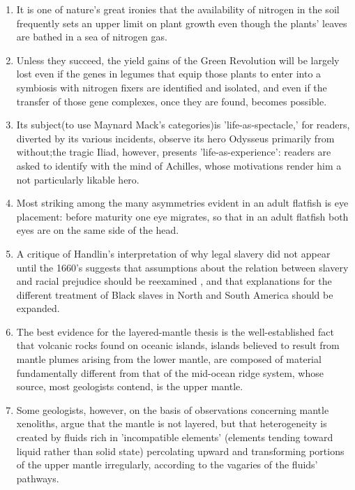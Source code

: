 \begin{enumerate}
\item It is one of nature's great ironies that the availability of nitrogen in the
soil frequently sets an upper limit on plant growth even though the plants' leaves are bathed in a sea of nitrogen gas.

\item Unless they succeed, the yield gains of the Green Revolution will be largely lost even if the genes in legumes that equip those plants to enter  into a symbiosis with nitrogen fixers are identified and isolated, and even if the transfer of those gene complexes, once they are found,  becomes possible.

\item Its subject(to use Maynard Mack's categories)is 'life-as-spectacle,' for readers,   diverted by its various incidents, observe its hero Odysseus primarily from without;the tragic Iliad, however, presents 'life-as-experience': readers are asked to identify with the mind of  Achilles, whose motivations render him a not particularly likable hero.

\item Most striking among the many asymmetries evident in an adult flatfish is eye placement:  before maturity one eye migrates, so that in an adult flatfish both eyes are on the same side of the head. 

\item A critique of Handlin's interpretation of why legal slavery did not appear
until the 1660's suggests that assumptions about the relation between slavery and racial prejudice should be reexamined , and that explanations for the different treatment of Black slaves in North and South America should be expanded.

\item The best evidence for the layered-mantle thesis is the well-established fact that volcanic rocks found on oceanic islands, islands believed to result from mantle plumes arising from the lower mantle, are composed of material fundamentally different from that of the mid-ocean ridge system,  whose source, most geologists contend, is the upper mantle. 

\item Some geologists, however, on the basis of observations concerning
mantle xenoliths,  argue that the mantle is not layered, but that heterogeneity is created by fluids rich in 'incompatible elements' (elements tending toward liquid rather than solid state) percolating upward and transforming portions of the upper mantle  irregularly, according to the vagaries of the fluids' pathways.


\end{enumerate}
